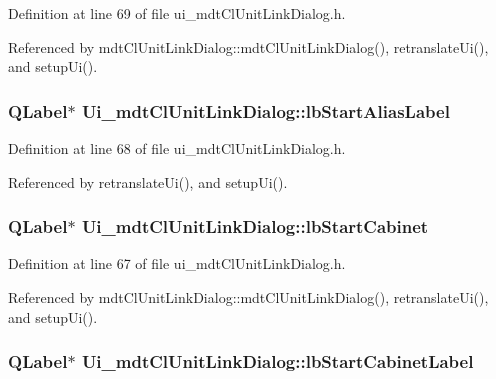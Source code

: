 Definition at line 69 of file ui\-\_\-mdt\-Cl\-Unit\-Link\-Dialog.\-h.



Referenced by mdt\-Cl\-Unit\-Link\-Dialog\-::mdt\-Cl\-Unit\-Link\-Dialog(), retranslate\-Ui(), and setup\-Ui().

\hypertarget{class_ui__mdt_cl_unit_link_dialog_a4c469cefd7c39afa074f9cafb81f241f}{
\subsubsection[{lb\-Start\-Alias\-Label}]{\setlength{\rightskip}{0pt plus 5cm}Q\-Label$\ast$ Ui\-\_\-mdt\-Cl\-Unit\-Link\-Dialog\-::lb\-Start\-Alias\-Label}}\label{class_ui__mdt_cl_unit_link_dialog_a4c469cefd7c39afa074f9cafb81f241f}


Definition at line 68 of file ui\-\_\-mdt\-Cl\-Unit\-Link\-Dialog.\-h.



Referenced by retranslate\-Ui(), and setup\-Ui().

\hypertarget{class_ui__mdt_cl_unit_link_dialog_a1bd88ffdb86f483a98b1932714f55e96}{
\subsubsection[{lb\-Start\-Cabinet}]{\setlength{\rightskip}{0pt plus 5cm}Q\-Label$\ast$ Ui\-\_\-mdt\-Cl\-Unit\-Link\-Dialog\-::lb\-Start\-Cabinet}}\label{class_ui__mdt_cl_unit_link_dialog_a1bd88ffdb86f483a98b1932714f55e96}


Definition at line 67 of file ui\-\_\-mdt\-Cl\-Unit\-Link\-Dialog.\-h.



Referenced by mdt\-Cl\-Unit\-Link\-Dialog\-::mdt\-Cl\-Unit\-Link\-Dialog(), retranslate\-Ui(), and setup\-Ui().

\hypertarget{class_ui__mdt_cl_unit_link_dialog_aec94e9584ce6254e143c71d06c219dbe}{
\subsubsection[{lb\-Start\-Cabinet\-Label}]{\setlength{\rightskip}{0pt plus 5cm}Q\-Label$\ast$ Ui\-\_\-mdt\-Cl\-Unit\-Link\-Dialog\-::lb\-Start\-Cabinet\-Label}}\label{class_ui__mdt_cl_unit_link_dialog_aec94e9584ce6254e143c71d06c219dbe}


